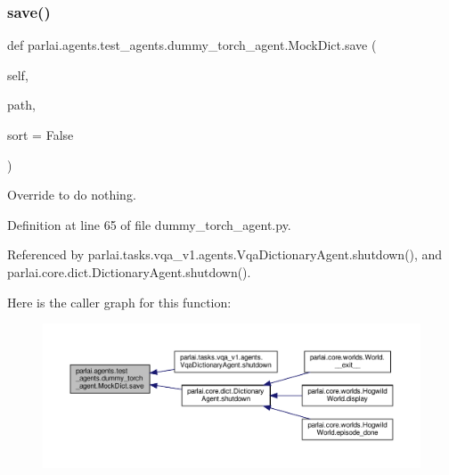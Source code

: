 \subsubsection{\texorpdfstring{save()}{save()}}
{\footnotesize\ttfamily def parlai.\+agents.\+test\+\_\+agents.\+dummy\+\_\+torch\+\_\+agent.\+Mock\+Dict.\+save (\begin{DoxyParamCaption}\item[{}]{self,  }\item[{}]{path,  }\item[{}]{sort = {\ttfamily False} }\end{DoxyParamCaption})}

\begin{DoxyVerb}Override to do nothing.\end{DoxyVerb}
 

Definition at line 65 of file dummy\+\_\+torch\+\_\+agent.\+py.



Referenced by parlai.\+tasks.\+vqa\+\_\+v1.\+agents.\+Vqa\+Dictionary\+Agent.\+shutdown(), and parlai.\+core.\+dict.\+Dictionary\+Agent.\+shutdown().

Here is the caller graph for this function\+:
\nopagebreak
\begin{figure}[H]
\begin{center}
\leavevmode
\includegraphics[width=350pt]{classparlai_1_1agents_1_1test__agents_1_1dummy__torch__agent_1_1MockDict_a999f231b74f567c2a897eaac2e354a9b_icgraph}
\end{center}
\end{figure}
\mbox{\label{classparlai_1_1agents_1_1test__agents_1_1dummy__torch__agent_1_1MockDict_a390123aa7a8a16f5971a7dfbe261d353}} 

